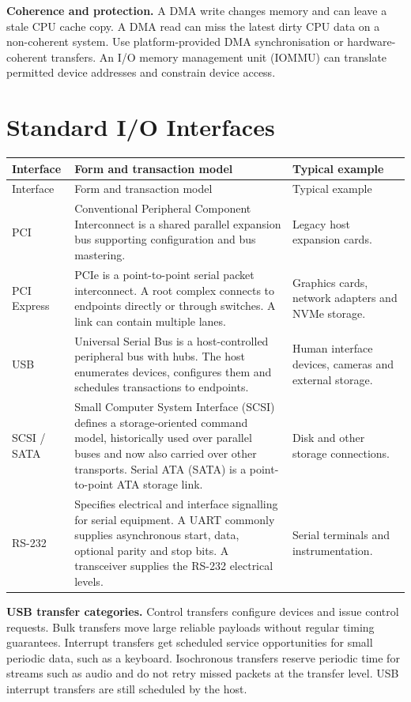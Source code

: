 \documentclass[12pt,a4paper]{article}
\begin{document}
\textbf{Coherence and protection.} A DMA write changes memory and can leave a stale CPU cache copy. A DMA read can miss the latest dirty CPU data on a non-coherent system. Use platform-provided DMA synchronisation or hardware-coherent transfers. An I/O memory management unit (IOMMU) can translate permitted device addresses and constrain device access.

\section{Standard I/O Interfaces}
\begin{longtable}{|B{2.45cm}|>{\small\raggedright\arraybackslash}m{\dimexpr(\linewidth-2.45cm-6\arrayrulewidth)/2\relax}|>{\small\raggedright\arraybackslash}m{\dimexpr(\linewidth-2.45cm-6\arrayrulewidth)/2\relax}|}
\hline
Interface & Form and transaction model & Typical example \\ \hline
\endfirsthead
\hline
Interface & Form and transaction model & Typical example \\ \hline
\endhead
PCI & Conventional Peripheral Component Interconnect is a shared parallel expansion bus supporting configuration and bus mastering. & Legacy host expansion cards. \\ \hline
PCI Express & PCIe is a point-to-point serial packet interconnect. A root complex connects to endpoints directly or through switches. A link can contain multiple lanes. & Graphics cards, network adapters and NVMe storage. \\ \hline
USB & Universal Serial Bus is a host-controlled peripheral bus with hubs. The host enumerates devices, configures them and schedules transactions to endpoints. & Human interface devices, cameras and external storage. \\ \hline
SCSI / SATA & Small Computer System Interface (SCSI) defines a storage-oriented command model, historically used over parallel buses and now also carried over other transports. Serial ATA (SATA) is a point-to-point ATA storage link. & Disk and other storage connections. \\ \hline
RS-232 & Specifies electrical and interface signalling for serial equipment. A UART commonly supplies asynchronous start, data, optional parity and stop bits. A transceiver supplies the RS-232 electrical levels. & Serial terminals and instrumentation. \\ \hline
\end{longtable}

\textbf{USB transfer categories.} Control transfers configure devices and issue control requests. Bulk transfers move large reliable payloads without regular timing guarantees. Interrupt transfers get scheduled service opportunities for small periodic data, such as a keyboard. Isochronous transfers reserve periodic time for streams such as audio and do not retry missed packets at the transfer level. USB interrupt transfers are still scheduled by the host.
\end{document}
